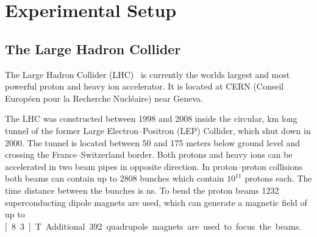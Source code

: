 \chapter{Experimental Setup}\label{cha:setup}

\section{The Large Hadron Collider}\label{sec:setup:lhc}

The Large Hadron Collider (LHC)~\cite{LHC} is currently the worlds largest and most powerful proton and heavy ion accelerator.
It is located at CERN (Conseil Européen pour la Recherche Nucléaire) near Geneva.

The LHC was constructed between 1998 and 2008 inside the circular, \unit[27]{km} long tunnel
of the former Large Electron--Positron (LEP) Collider, which shut down in 2000.
The tunnel is located between 50 and 175 meters below ground level and crossing the France--Switzerland border.
Both protons and heavy ions can be accelerated in two beam pipes in opposite direction.
In proton--proton collisions both beams can contain up to 2808 bunches which contain $10^{11}$ protons each.
The time distance between the bunches is \unit[25]{ns}.
To bend the proton beams 1232 superconducting dipole magnets are used, which can generate a magnetic field of up
to \unit[8.3]{T}.
Additional 392 quadrupole magnets are used to focus the beams.

